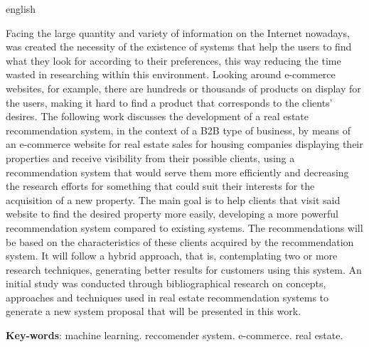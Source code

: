 \begin{resumo}[Abstract]
 \begin{otherlanguage*}{english}

Facing the large quantity and variety of information on the Internet nowadays, was created the necessity of the existence of systems that help the users to find what they look for according to their preferences, this way reducing the time wasted in researching within this environment. Looking around e-commerce websites, for example, there are hundreds or thousands of products on display for the users, making it hard to find a product that corresponds to the clients' desires. The following work discusses the development of a real estate recommendation system, in the context of a B2B type of business, by means of an e-commerce website for real estate sales for housing companies displaying their properties and receive visibility from their possible clients, using a recommendation system that would serve them more efficiently and decreasing the research efforts for something that could suit their interests for the acquisition of a new property. The main goal is to help clients that visit said website to find the desired property more easily, developing a more powerful recommendation system compared to existing systems. The recommendations will be based on the characteristics of these clients acquired by the recommendation system. It will follow a hybrid approach, that is, contemplating two or more research techniques, generating better results for customers using this system. An initial study was conducted through bibliographical research on concepts, approaches and techniques used in real estate recommendation systems to generate a new system proposal that will be presented in this work.

   \vspace{\onelineskip}
 
   \noindent 
   \textbf{Key-words}: machine learning. reccomender system. e-commerce. real estate.
 \end{otherlanguage*}
\end{resumo}

